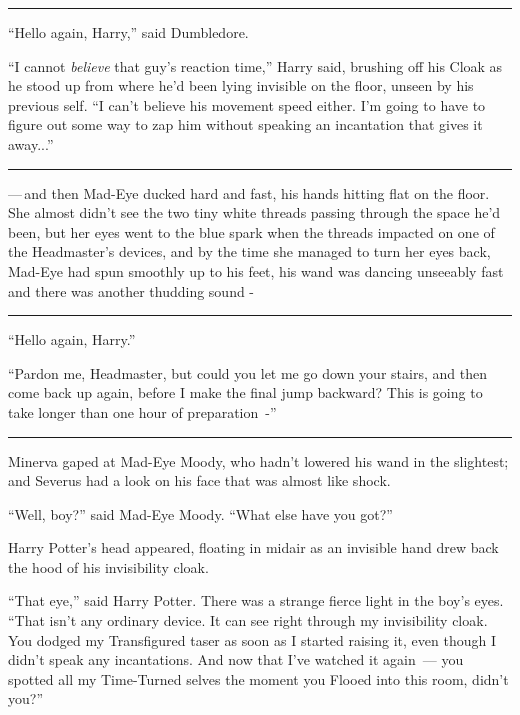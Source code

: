 \begin{center}\rule{3in}{0.4pt}\end{center}

``Hello again, Harry,'' said Dumbledore.

``I cannot \emph{believe} that guy's reaction time,'' Harry said, brushing off his Cloak as he stood up from where he'd been lying invisible on the floor, unseen by his previous self. ``I can't believe his movement speed either. I'm going to have to figure out some way to zap him without speaking an incantation that gives it away...''

\begin{center}\rule{3in}{0.4pt}\end{center}

---\,and then Mad-Eye ducked hard and fast, his hands hitting flat on the floor. She almost didn't see the two tiny white threads passing through the space he'd been, but her eyes went to the blue spark when the threads impacted on one of the Headmaster's devices, and by the time she managed to turn her eyes back, Mad-Eye had spun smoothly up to his feet, his wand was dancing unseeably fast and there was another thudding sound -

\begin{center}\rule{3in}{0.4pt}\end{center}

``Hello again, Harry.''

``Pardon me, Headmaster, but could you let me go down your stairs, and then come back up again, before I make the final jump backward? This is going to take longer than one hour of preparation~-''

\begin{center}\rule{3in}{0.4pt}\end{center}

Minerva gaped at Mad-Eye Moody, who hadn't lowered his wand in the slightest; and Severus had a look on his face that was almost like shock.

``Well, boy?'' said Mad-Eye Moody. ``What else have you got?''

Harry Potter's head appeared, floating in midair as an invisible hand drew back the hood of his invisibility cloak.

``That eye,'' said Harry Potter. There was a strange fierce light in the boy's eyes. ``That isn't any ordinary device. It can see right through my invisibility cloak. You dodged my Transfigured taser as soon as I started raising it, even though I didn't speak any incantations. And now that I've watched it again~--- you spotted all my Time-Turned selves the moment you Flooed into this room, didn't you?''

